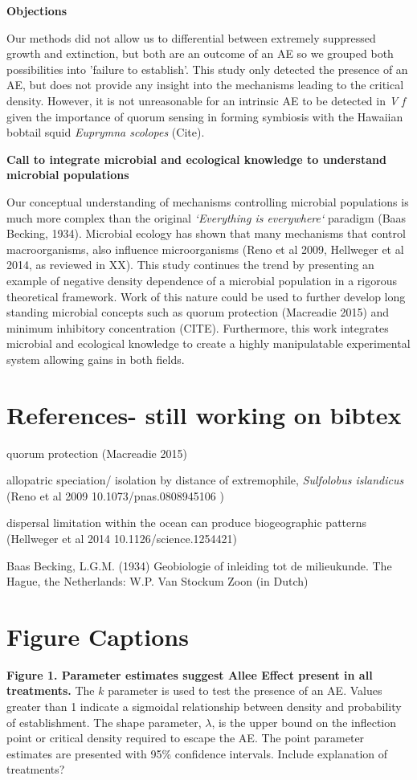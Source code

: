 \documentclass[a4paper,10pt]{article}
\begin{document}
\textbf{Objections}

Our methods did not allow us to differential between extremely suppressed growth and extinction, but both are an outcome of an AE so we grouped both possibilities into 'failure to establish'. 
This study only detected the presence of an AE, but does not provide any insight into the mechanisms leading to the critical density. However, it is not unreasonable for an intrinsic AE to be detected in \textit{V f} given the importance of quorum sensing in forming symbiosis with the Hawaiian bobtail squid \textit{Euprymna scolopes} (Cite).
  
\textbf{Call to integrate microbial and ecological knowledge to understand microbial populations}

Our conceptual understanding of mechanisms controlling microbial populations is much more complex than the original \textit{`Everything is everywhere`} paradigm (Baas Becking, 1934). Microbial ecology has shown that many mechanisms that control macroorganisms, also influence microorganisms (Reno et al 2009, Hellweger et al 2014, as reviewed in XX). This study continues the trend by presenting an example of negative density dependence of a microbial population in a rigorous theoretical framework. Work of this nature could be used to further develop long standing microbial concepts such as quorum protection (Macreadie 2015) and minimum inhibitory concentration (CITE). Furthermore, this work integrates microbial and ecological knowledge to create a highly manipulatable experimental system allowing gains in both fields.  


\section{References- still working on bibtex}
quorum protection (Macreadie 2015)

allopatric speciation/ isolation by distance of extremophile, \textit{Sulfolobus islandicus} (Reno et al 2009 10.1073/pnas.0808945106 )

dispersal limitation within the ocean can produce biogeographic patterns (Hellweger et al 2014 10.1126/science.1254421)

Baas Becking, L.G.M. (1934) Geobiologie of inleiding tot de milieukunde. The Hague, the Netherlands: W.P. Van Stockum  Zoon (in Dutch)

\section{Figure Captions}
\textbf{Figure 1. Parameter estimates suggest Allee Effect present in all treatments.} The $k$ parameter is used to test the presence of an AE. Values greater than 1 indicate a sigmoidal relationship between density and probability of establishment. The shape parameter, $\lambda$, is the upper bound on the inflection point or critical density required to escape the AE. The point parameter estimates are presented with 95\% confidence intervals.  Include explanation of treatments?
\end{document}
